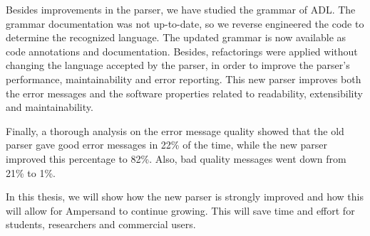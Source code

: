 Besides improvements in the parser, we have studied the grammar of ADL.
The grammar documentation was not up-to-date, so we reverse engineered the code to determine the recognized language.
The updated grammar is now available as code annotations and documentation.
Besides, refactorings were applied without changing the language accepted by the parser, in order to improve the parser's performance, maintainability and error reporting.
This new parser improves both the error messages and the software properties related to readability, extensibility and maintainability.

Finally, a thorough analysis on the error message quality showed that the old parser gave good error messages in 22\% of the time, while the new parser improved this percentage to 82\%.
Also, bad quality messages went down from 21\% to 1\%.

In this thesis, we will show how the new parser is strongly improved and how this will allow for Ampersand to continue growing.
This will save time and effort for students, researchers and commercial users.
